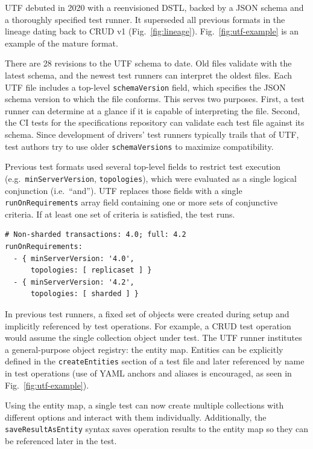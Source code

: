 \documentclass[conference]{IEEEtran}
\begin{document}
UTF debuted in 2020 with a reenvisioned DSTL, backed by a JSON schema and a thoroughly specified test runner. It superseded all previous formats in the lineage dating back to CRUD v1 (Fig.~\ref{fig:lineage}). Fig.~\ref{fig:utf-example} is an example of the mature format.

There are 28 revisions to the UTF schema to date. Old files validate with the latest schema, and the newest test runners can interpret the oldest files. Each UTF file includes a top-level \texttt{schemaVersion} field, which specifies the JSON schema version to which the file conforms. This serves two purposes. First, a test runner can determine at a glance if it is capable of interpreting the file. Second, the CI tests for the specifications repository can validate each test file against its schema. Since development of drivers' test runners typically trails that of UTF, test authors try to use older \texttt{schemaVersions} to maximize compatibility.

Previous test formats used several top-level fields to restrict test execution (e.g.\ \texttt{minServerVersion}, \texttt{topologies}), which were evaluated as a single logical conjunction (i.e.\ ``and''). UTF replaces those fields with a single \texttt{runOnRequirements} array field containing one or more sets of conjunctive criteria. If at least one set of criteria is satisfied, the test runs.

\begin{Verbatim}[fontsize=\small, frame=single]
# Non-sharded transactions: 4.0; full: 4.2
runOnRequirements:
  - { minServerVersion: '4.0',
      topologies: [ replicaset ] }
  - { minServerVersion: '4.2',
      topologies: [ sharded ] }
\end{Verbatim}

In previous test runners, a fixed set of objects were created during setup and implicitly referenced by test operations. For example, a CRUD test operation would assume the single collection object under test. The UTF runner institutes a general-purpose object registry: the entity map. Entities can be explicitly defined in the \texttt{createEntities} section of a test file and later referenced by name in test operations (use of YAML anchors and aliases is encouraged, as seen in Fig.~\ref{fig:utf-example}).

Using the entity map, a single test can now create multiple collections with different options and interact with them individually. Additionally, the \texttt{saveResultAsEntity} syntax saves operation results to the entity map so they can be referenced later in the test.
\end{document}

